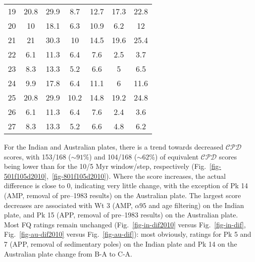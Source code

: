 \begin{table}
{\begin{tabular}{@{}ccccccc@{}}
      19 & 20.8 & 29.9 & 8.7 & 12.7 & 17.3 & 22.8 \\
      20 & 10 & 18.1 & 6.3 & 10.9 & 6.2 & 12 \\
      21 & 21 & 30.3 & 10 & 14.5 & 19.6 & 25.4 \\
      22 & 6.1 & 11.3 & 6.4 & 7.6 & 2.5 & 3.7 \\
      23 & 8.3 & 13.3 & 5.2 & 6.6 & 5 & 6.5 \\
      24 & 9.9 & 17.8 & 6.4 & 11.1 & 6 & 11.6 \\
      25 & 20.8 & 29.9 & 10.2 & 14.8 & 19.2 & 24.8 \\
      26 & 6.1 & 11.3 & 6.4 & 7.6 & 2.4 & 3.6 \\
      27 & 8.3 & 13.3 & 5.2 & 6.6 & 4.8 & 6.2 \\ \bottomrule
    \end{tabular}%
  }
\end{table}

For the Indian and Australian plates, there is a trend towards decreased
$\mathcal{CPD}$ scores, with 153/168 (${\sim}91$\%) and 104/168 (${\sim}62$\%)
of equivalent $\mathcal{CPD}$ scores being lower than for the 10/5 Myr
window/step, respectively (Fig.~\ref{fig-501f105d2010},~\ref{fig-801f105d2010}).
Where the score increases, the actual difference is close to 0, indicating very
little change, with the exception of Pk 14 (AMP, removal of pre–1983 results) on
the Australian plate. The largest score decreases are associated with Wt 3 (AMP,
${\alpha}95$ and age filtering) on the Indian plate, and Pk 15 (APP, removal of
pre–1983 results) on the Australian plate. Most FQ ratings remain unchanged
(Fig.~\ref{fig-in-dif2010} versus Fig.~\ref{fig-in-dif},
Fig.~\ref{fig-au-dif2010} versus Fig.~\ref{fig-au-dif}): most obviously, ratings
for Pk 5 and 7 (APP, removal of sedimentary poles) on the Indian plate and Pk 14
on the Australian plate change from B-A to C-A.

